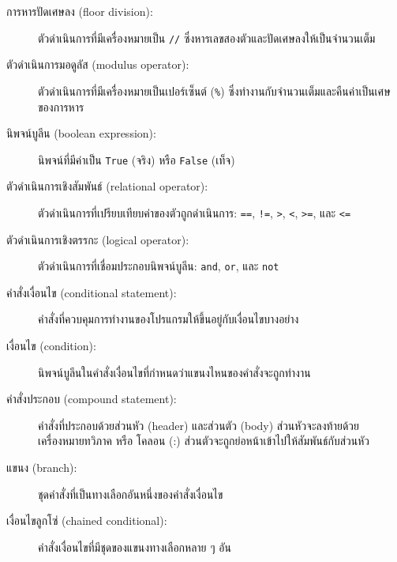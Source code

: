 \begin{description}

\item[การหารปัดเศษลง (floor division):] ตัวดำเนินการที่มีเครื่องหมายเป็น {\tt //} ซึ่งหารเลขสองตัวและปัดเศษลงให้เป็นจำนวนเต็ม

\item[ตัวดำเนินการมอดูลัส (modulus operator):]  ตัวดำเนินการที่มีเครื่องหมายเป็นเปอร์เซ็นต์ ({\tt \%})
ซึ่งทำงานกับจำนวนเต็มและคืนค่าเป็นเศษของการหาร 

\item[นิพจน์บูลีน (boolean expression):] นิพจน์ที่มีค่าเป็น {\tt True} (จริง) หรือ {\tt False} (เท็จ)

\item[ตัวดำเนินการเชิงสัมพันธ์ (relational operator):] ตัวดำเนินการที่เปรียบเทียบค่าของตัวถูกดำเนินการ: 
{\tt ==}, {\tt !=}, {\tt >}, {\tt <}, {\tt >=}, และ {\tt <=}

\item[ตัวดำเนินการเชิงตรรกะ (logical operator):] ตัวดำเนินการที่เชื่อมประกอบนิพจน์บูลีน: 
{\tt and}, {\tt or}, และ {\tt not}

\item[คำสั่งเงื่อนไข (conditional statement):]  คำสั่งที่ควบคุมการทำงานของโปรแกรมให้ขึ้นอยู่กับเงื่อนไขบางอย่าง

\item[เงื่อนไข (condition):] นิพจน์บูลีนในคำสั่งเงื่อนไขที่กำหนดว่าแขนงไหนของคำสั่งจะถูกทำงาน 

\item[คำสั่งประกอบ (compound statement):]  คำสั่งที่ประกอบด้วยส่วนหัว (header) และส่วนตัว (body)
ส่วนหัวจะลงท้ายด้วยเครื่องหมายทวิภาค หรือ โคลอน (:) ส่วนตัวจะถูกย่อหน้าเข้าไปให้สัมพันธ์กับส่วนหัว 

\item[แขนง (branch):] ชุดคำสั่งที่เป็นทางเลือกอันหนึ่งของคำสั่งเงื่อนไข 

\item[เงื่อนไขลูกโซ่ (chained conditional):]  คำสั่งเงื่อนไขที่มีชุดของแขนงทางเลือกหลาย ๆ อัน


\end{description}
